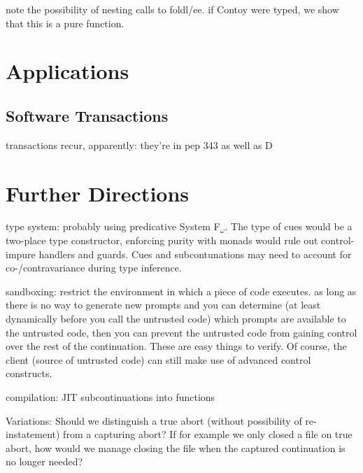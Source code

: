 \documentclass[11pt]{article}
\newcommand{\maybePage}{\newpage}
\begin{document}
note the possibility of nesting calls to foldl/ee.
if Contoy were typed, we show that this is a pure function.

\section{Applications}
\label{application}


\subsection{Software Transactions}

transactions recur, apparently: they're in pep 343 as well as D


\section{Further Directions}

type system: probably using predicative System F$_\omega$. The type of cues would be a two-place type constructor, enforcing purity with monads would rule out control-impure handlers and guards. Cues and subcontunations may need to account for co-/contravariance during type inference.

sandboxing: restrict the environment in which a piece of code executes. as long as there is no way to generate new prompts and you can determine (at least dynamically before you call the untrusted code) which prompts are available to the untrusted code, then you can prevent the untrusted code from gaining control over the rest of the continuation. These are easy things to verify. Of course, the client (source of untrusted code) can still make use of advanced control constructs.

compilation: JIT subcontinuations into functions

Variations:
Should we distinguish a true abort (without possibility of re-instatement) from a capturing abort? If for example we only closed a file on true abort, how would we manage closing the file when the captured continuation is no longer needed?






\maybePage


\end{document}
